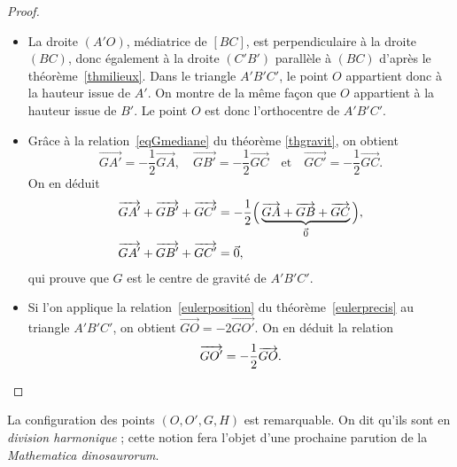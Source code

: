 \begin{proof}
\begin{itemize}
\item La droite $(A'O)$, médiatrice de $[BC]$, est perpendiculaire à la droite $(BC)$, donc également à la droite $(C'B')$ parallèle à $(BC)$ d'après le théorème \ref{thmilieux}. Dans le triangle $A'B'C'$, le point $O$ appartient donc à la hauteur issue de $A'$. On montre de la même façon que $O$ appartient à la hauteur issue de $B'$. Le point $O$ est donc l'orthocentre de $A'B'C'$.
\item Grâce à la relation \eqref{eqGmediane} du théorème \ref{thgravit}, on obtient
\[\overrightarrow{GA'}=-\frac12\overrightarrow{GA},\quad \overrightarrow{GB'}=-\frac12\overrightarrow{GC}\quad\text{et}\quad\overrightarrow{GC'}=-\frac12\overrightarrow{GC}.\]
On en déduit
\begin{align*}
\overrightarrow{GA'}+\overrightarrow{GB'}+\overrightarrow{GC'}&=-\frac12\Bigl(\,\underbrace{\overrightarrow{GA}+\overrightarrow{GB}+\overrightarrow{GC}}_{\vec{0}}\,\Bigr),\\
\overrightarrow{GA'}+\overrightarrow{GB'}+\overrightarrow{GC'}&=\vec{0},
\end{align*}
qui prouve que $G$ est le centre de gravité de $A'B'C'$.
\item Si l'on applique la relation \eqref{eulerposition} du théorème \ref{eulerprecis} au triangle $A'B'C'$, on obtient $\overrightarrow{GO}=-2\overrightarrow{GO'}$. On en déduit la relation
\[\overrightarrow{GO'}=-\frac12\overrightarrow{GO}.\qedhere\]\end{itemize}
\end{proof}

\begin{remark}
La configuration des  points  $(O, O', G, H)$  est remarquable. On dit qu'ils sont en \emph{division harmonique} ; cette notion fera l'objet d'une prochaine parution de la \emph{Mathematica dinosaurorum}.
\end{remark}
\endinput
